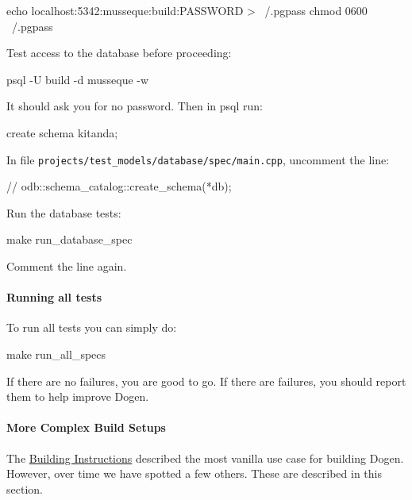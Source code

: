 \documentclass{book}
\begin{document}
\begin{pseudocode}[backgroundcolor=\color{lightgray}]
echo localhost:5342:musseque:build:PASSWORD > ~/.pgpass
chmod 0600 ~/.pgpass
\end{pseudocode}

Test access to the database before proceeding:

\begin{pseudocode}[backgroundcolor=\color{lightgray}]
psql -U build -d musseque -w
\end{pseudocode}

It should ask you for no password. Then in psql run:

\begin{pseudocode}[backgroundcolor=\color{lightgray}]
create schema kitanda;
\end{pseudocode}

In file \texttt{projects/test\_models/database/spec/main.cpp},
uncomment the line:

\begin{pseudocode}[backgroundcolor=\color{lightgray}]
// odb::schema_catalog::create_schema(*db);
\end{pseudocode}

Run the database tests:

\begin{pseudocode}[backgroundcolor=\color{lightgray}]
make run_database_spec
\end{pseudocode}

Comment the line again.

\paragraph{Running all tests}

To run all tests you can simply do:

\begin{pseudocode}[backgroundcolor=\color{lightgray}]
make run_all_specs
\end{pseudocode}

If there are no failures, you are good to go. If there are failures,
you should report them to help improve Dogen.

\paragraph{More Complex Build Setups}

The
\href{https://github.com/DomainDrivenConsulting/dogen/blob/master/doc/manual/manual.org#building-instructions}{Building
  Instructions} described the most vanilla use case for building
Dogen. However, over time we have spotted a few others. These are
described in this section.
\end{document}
